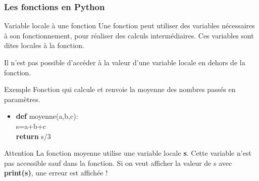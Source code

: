 \documentclass[9pt]{beamer}
\begin{document}
%
%
%


\begin{frame}
\frametitle{Les fonctions en Python}

\begin{block}{Variable locale à une fonction}
Une fonction peut utiliser des variables nécessaires à son fonctionnement, pour réaliser des calculs intermédiaires. Ces variables sont dites locales à la fonction.

Il n'est pas possible d'accéder à la valeur d'une variable locale en dehors de la fonction.
\end{block}

\begin{exampleblock}{Exemple}
Fonction qui calcule et renvoie la moyenne des nombres passés en paramètres.
\begin{itemize}
\item \textbf{def} moyenne(a,b,c):\\
\hspace{0.5cm}s=a+b+c\\
\hspace{0.5cm}\textbf{return} s/3
\end{itemize}
\end{exampleblock}

\begin{alertblock}{Attention}
La fonction moyenne utilise une variable locale \textbf{s}. Cette variable n'est pas accessible sauf dans la fonction.
Si on veut afficher la valeur de s avec \textbf{print(s)}, une erreur est affichée !
\end{alertblock}
\end{frame}
\end{document}
